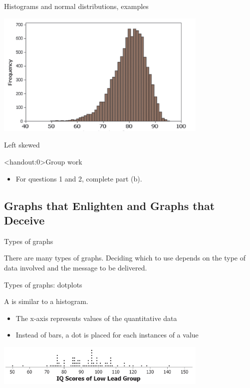\documentclass[]{beamer}
\begin{document}
\begin{frame}{Histograms and normal distributions, examples}

{\centering
\includegraphics[width=4in]{../images/ch02_hist_lskew}
\par}
\bigskip
\pause
\begin{block}{}
\centering \large Left skewed
\end{block}
\end{frame}


\begin{frame}<handout:0>{Group work}
\begin{block}{}
\large
\begin{itemize}
\item For questions 1 and 2, complete part (b).
\end{itemize}
\end{block}
\end{frame}


\subsection{Graphs that Enlighten and Graphs that Deceive}

\begin{frame}{Types of graphs}

\begin{block}{}
\large
There are many types of graphs. Deciding which to use depends on the type of data involved and the message to be delivered.
\end{block}
\end{frame}

\begin{frame}{Types of graphs: dotplots}
\begin{block}{}
A  is similar to a histogram. 
\begin{itemize}
\item The x-axis represents values of the quantitative data
\item Instead of bars, a dot is placed for each instances of a value
\end{itemize}
\end{block}
\bigskip
{\centering
\includegraphics[width=4in]{../images/ch02_dotplot}
\par}
\end{frame}
\end{document}
